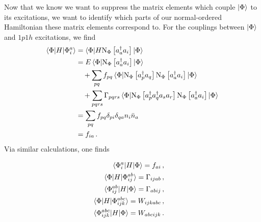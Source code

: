 Now that we know we want to suppress the matrix elements
which couple $\ket{\Phi}$ to its excitations,
we want to identify which parts of our normal-ordered Hamiltonian
these matrix elements correspond to.
For the couplings between $\ket{\Phi}$ and $1p1h$ excitations, we find
\begin{align}
  \phantom{\braket{\Phi | H |\Phi_{i}^{a}}}
  &\begin{aligned}
    \mathllap{\braket{\Phi | H |\Phi_{i}^{a}}} &= \braket{\Phi | H \noref{\crea{a} \annih{i}}| \Phi}
  \end{aligned}\\
  &\begin{aligned}
    \mathllap{}&= E \braket{\Phi | \noref{\crea{a} \annih{i}} | \Phi} \\
    &\quad + \sum_{pq} f_{pq} \braket{\Phi |\noref{\crea{p}\annih{q}} \noref{\crea{a} \annih{i}} | \Phi} \\
    &\quad + \sum_{pqrs} \Gamma_{pqrs}
    \braket{\Phi |\noref{\crea{p} \crea{q} \annih{s} \annih{r}}\noref{\crea{a} \annih{i}} | \Phi}
  \end{aligned}\\
  &\begin{aligned}
    \mathllap{}&= \sum_{pq} f_{pq} \delta_{pi} \delta_{qa} n_{i} \bar{n}_{a}
  \end{aligned}\\
  &\begin{aligned}
    \mathllap{}&= f_{ia}\,.
  \end{aligned}
\end{align}
Via similar calculations, one finds
\begin{samepage}
  \begin{subequations}
    \begin{align}
      \begin{split}
        \braket{\Phi_{i}^{a} | H | \Phi} &= f_{ai}\,,
      \end{split}\\
      \begin{split}
        \braket{\Phi | H | \Phi_{ij}^{ab}} &= \Gamma_{ijab}\,,
      \end{split}\\
      \begin{split}
        \braket{\Phi_{ij}^{ab} | H | \Phi} &= \Gamma_{abij}\,,
      \end{split}\\
      \begin{split}
        \braket{\Phi | H | \Phi_{ijk}^{abc}} &= W_{ijkabc}\,,
      \end{split}\\
      \begin{split}
        \braket{\Phi_{ijk}^{abc} | H | \Phi} &= W_{abcijk}\,.
      \end{split}
    \end{align}
  \end{subequations}
\end{samepage}
